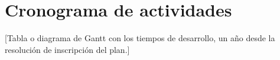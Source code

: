 \section{Cronograma de actividades}
\label{sec:cronograma}
[Tabla o diagrama de Gantt con los tiempos de desarrollo, un año desde la resolución de inscripción del plan.]